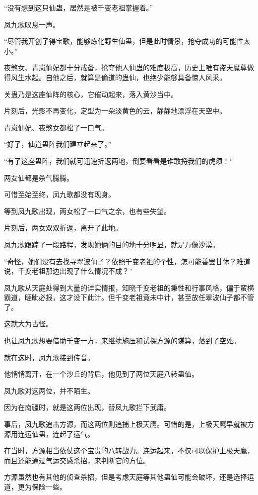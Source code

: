 \begin{this_body}
“没有想到这只仙蛊，居然是被千变老祖掌握着。”

凤九歌叹息一声。

“尽管我开创了得宝歌，能够炼化野生仙蛊，但是此时情景，抢夺成功的可能性太小。”

夜煞女、青岚仙妃都十分戒备，抢夺他人仙蛊的难度极高，历史上唯有盗天魔尊做得风生水起。自他之后，就算是偷道的蛊仙，也绝少能够具备惊人风采。

关蛊乃是这座仙阵的核心，它催动起来，落入黄沙当中。

片刻后，光影不再变化，定型为一朵淡黄色的云，静静地漂浮在天空中。

青岚仙妃、夜煞女都松了一口气。

“好了，仙道蛊阵我们建立起来了。”

“有了这座蛊阵，我们就可迅速折返两地，倒要看看是谁敢捋我们的虎须！”

两女仙都是杀气腾腾。

可惜至始至终，凤九歌都没有现身。

等到凤九歌出现，两女松了一口气之余，也有些失望。

片刻后，两女双双折返，离开了此地。

凤九歌跟踪了一段路程，发现她俩的目的地十分明显，就是万像沙漠。

“奇怪，她们没有去找寻翠波仙子？依照千变老祖的个性，怎可能善罢甘休？难道说，千变老祖那边出现了什么情况不成？”

凤九歌从天庭处得到大量的详实情报，知晓千变老祖的秉性和行事风格，偏于蛮横霸道，睚眦必报，这才设下此计。但千变老祖竟未中计，甚至放任翠波仙子都不管了。

这就大为古怪。

也让凤九歌想要借助千变一方，来继续施压和试探方源的谋算，落到了空处。

就在这时，凤九歌接到传音。

他悄悄离开，在一个沙丘的背后，他见到了两位天庭八转蛊仙。

凤九歌对这两位，并不陌生。

因为在南疆时，就是这两位出现，替凤九歌拦下武庸。

事后，凤九歌追击方源，而这两位则追捕上极天鹰。可惜的是，上极天鹰早就被方源用连运仙蛊，连起了运气。

在当时，方源相当依仗这个宝贵的八转战力。连运起来，不仅可以保护上极天鹰，而且还能通过气运交感杀招，来判断它的方位。

方源虽然也有其他的侦查杀招，但是考虑天庭等其他蛊仙可能会破坏，还是选择运道，更为保险一些。


\end{this_body}
